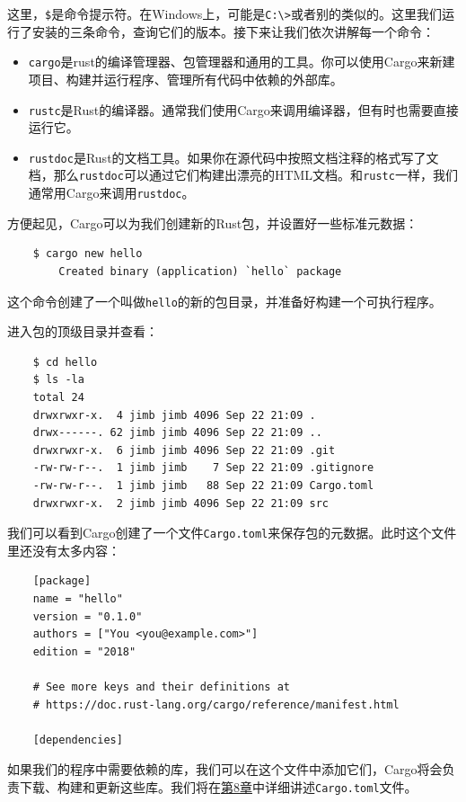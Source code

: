 这里，\texttt{\$}是命令提示符。在Windows上，可能是\texttt{C:\textbackslash>}或者别的类似的。这里我们运行了安装的三条命令，查询它们的版本。接下来让我们依次讲解每一个命令：
\begin{itemize}
    \item \texttt{cargo}是rust的编译管理器、包管理器和通用的工具。你可以使用Cargo来新建项目、构建并运行程序、管理所有代码中依赖的外部库。
    \item \texttt{rustc}是Rust的编译器。通常我们使用Cargo来调用编译器，但有时也需要直接运行它。
    \item \texttt{rustdoc}是Rust的文档工具。如果你在源代码中按照文档注释的格式写了文档，那么\texttt{rustdoc}可以通过它们构建出漂亮的HTML文档。和\texttt{rustc}一样，我们通常用Cargo来调用\texttt{rustdoc}。
\end{itemize}

方便起见，Cargo可以为我们创建新的Rust包，并设置好一些标准元数据：
\begin{verbatim}
    $ cargo new hello
        Created binary (application) `hello` package
\end{verbatim}

这个命令创建了一个叫做\texttt{hello}的新的包目录，并准备好构建一个可执行程序。

进入包的顶级目录并查看：
\begin{verbatim}
    $ cd hello
    $ ls -la
    total 24
    drwxrwxr-x.  4 jimb jimb 4096 Sep 22 21:09 .
    drwx------. 62 jimb jimb 4096 Sep 22 21:09 ..
    drwxrwxr-x.  6 jimb jimb 4096 Sep 22 21:09 .git
    -rw-rw-r--.  1 jimb jimb    7 Sep 22 21:09 .gitignore
    -rw-rw-r--.  1 jimb jimb   88 Sep 22 21:09 Cargo.toml
    drwxrwxr-x.  2 jimb jimb 4096 Sep 22 21:09 src
\end{verbatim}

我们可以看到Cargo创建了一个文件\texttt{Cargo.toml}来保存包的元数据。此时这个文件里还没有太多内容：
\begin{verbatim}
    [package]
    name = "hello"
    version = "0.1.0"
    authors = ["You <you@example.com>"]
    edition = "2018"

    # See more keys and their definitions at
    # https://doc.rust-lang.org/cargo/reference/manifest.html

    [dependencies]
\end{verbatim}

如果我们的程序中需要依赖的库，我们可以在这个文件中添加它们，Cargo将会负责下载、构建和更新这些库。我们将在\hyperref[ch08]{第8章}中详细讲述\texttt{Cargo.toml}文件。

